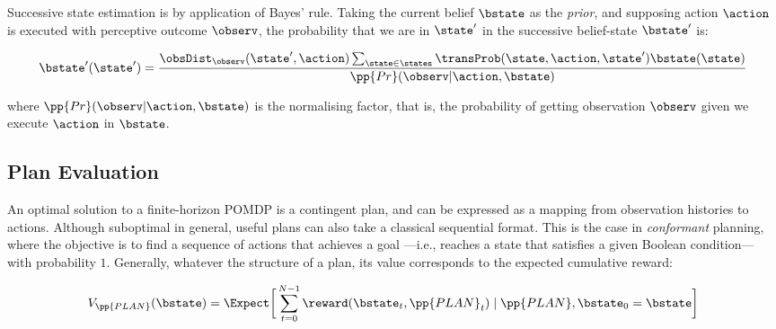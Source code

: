 \documentclass{article}
\begin{document}
Successive state estimation is by application of Bayes'
rule.  Taking the current belief $\bstate$ as the {\em prior}, and
supposing action $\action$ is executed with perceptive outcome
$\observ$, the probability that we are in $\state'$ in the
successive belief-state $\bstate'$ is:

\begin{equation}\label{eq:revision}
\bstate'(\state') = \frac{\obsDist_\observ(\state', \action)
  \sum_{\state\in \states} \transProb(\state, \action, \state') \bstate(\state) }{\pp{Pr}(\observ | \action, \bstate)}
\end{equation}

\noindent where $\pp{Pr}(\observ | \action, \bstate)$ is the
normalising factor, that is, the probability of getting observation
$\observ$ given we execute $\action$ in $\bstate$.

\subsection{Plan Evaluation}

An optimal solution to a finite-horizon POMDP is a contingent plan,
and can be expressed as a mapping from observation histories to
actions. Although suboptimal in general, useful plans can also take a
classical sequential format. This is the case in {\em conformant}
planning, where the objective is to find a sequence of actions that
achieves a goal ---i.e., reaches a state that satisfies a given
Boolean condition--- with probability $1$.  Generally, whatever the
structure of a plan, its value corresponds to the expected cumulative
reward:


\begin{equation}\label{eq:expectedvalue}
V_{\pp{PLAN}}(\bstate) = \Expect \bigg{[} 
\sum_{t=0}^{N-1}  \reward(\bstate_t, \pp{PLAN}_t) \mid \pp{PLAN}, \bstate_0 = \bstate \bigg{]}
\end{equation}
\end{document}
